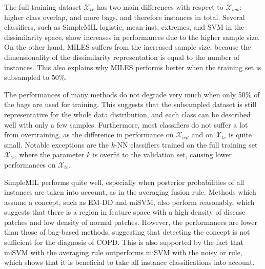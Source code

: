 \documentclass[10pt,conference,a4paper]{IEEEtran}
\begin{document}
The full training dataset $\mathcal{X}_{tr}$ has two main differences with respect to $\mathcal{X}_{sub}$: higher class overlap, and more bags, and therefore instances in total. Several classifiers, such as SimpleMIL logistic, mean-inst, extremes, and SVM in the dissimilarity space, show increases in performances due to the higher sample size. On the other hand, MILES suffers from the increased sample size, because the dimensionality of the dissimilarity representation is equal to the number of instances. This also explains why MILES performs better when the training set is subsampled to 50\%.

The performances of many methods do not degrade very much when only 50\% of the bags are used for training. This suggests that the subsampled dataset is still representative for the whole data distribution, and each class can be described well with only a few samples. Furthermore, most classifiers do not suffer a lot from overtraining, as the difference in performance on $\mathcal{X}_{val}$ and on $\mathcal{X}_{te}$ is quite small. Notable exceptions are the $k$-NN classifiers trained on the full training set $\mathcal{X}_{tr}$, where the parameter $k$ is overfit to the validation set, causing lower performances on $\mathcal{X}_{te}$.



SimpleMIL performs quite well, especially when posterior probabilities of all instances are taken into account, as in the averaging fusion rule. Methods which assume a concept, such as EM-DD and miSVM, also perform reasonably, which suggests that there is a region in feature space with a high density of disease patches and low density of normal patches. However, the performances are lower than those of bag-based methods, suggesting that detecting the concept is not sufficient for the diagnosis of COPD. This is also supported by the fact that miSVM with the averaging rule outperforms miSVM with the noisy or rule, which shows that it is beneficial to take all instance classifications into account.

\end{document}
